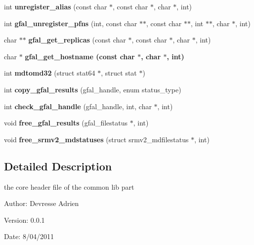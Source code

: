 \begin{CompactItemize}
\item 
int \textbf{unregister\_\-alias} (const char $\ast$, const char $\ast$, char $\ast$, int)\label{gfal__common_8h_2483d66384257fdbe3b1fd6c568709b8}

\item 
int \textbf{gfal\_\-unregister\_\-pfns} (int, const char $\ast$$\ast$, const char $\ast$$\ast$, int $\ast$$\ast$, char $\ast$, int)\label{group__internal__group_g70f889fa2436723fb7b3cff20b661f21}

\item 
char $\ast$$\ast$ \textbf{gfal\_\-get\_\-replicas} (const char $\ast$, const char $\ast$, char $\ast$, int)\label{group__internal__group_gbd0a581309f65e07a5e28d442f07b169}

\item 
char $\ast$ \bf{gfal\_\-get\_\-hostname} (const char $\ast$, char $\ast$, int)
\item 
int \textbf{mdtomd32} (struct stat64 $\ast$, struct stat $\ast$)\label{gfal__common_8h_279a394776e983460b0dc373238bbdeb}

\item 
int \textbf{copy\_\-gfal\_\-results} (gfal\_\-handle, enum status\_\-type)\label{gfal__common_8h_226eb7c7688af01a84b243e831f4af77}

\item 
int \textbf{check\_\-gfal\_\-handle} (gfal\_\-handle, int, char $\ast$, int)\label{gfal__common_8h_74b7456978e7b4059473733755d71b85}

\item 
void \textbf{free\_\-gfal\_\-results} (gfal\_\-filestatus $\ast$, int)\label{gfal__common_8h_912fe2b722650ab952e78a8c44e28660}

\item 
void \textbf{free\_\-srmv2\_\-mdstatuses} (struct srmv2\_\-mdfilestatus $\ast$, int)\label{gfal__common_8h_00141b129093611da15bab0cee7fc196}

\end{CompactItemize}


\subsection{Detailed Description}
the core header file of the common lib part 

\begin{Desc}
\item[Author:]Devresse Adrien \end{Desc}
\begin{Desc}
\item[Version:]0.0.1 \end{Desc}
\begin{Desc}
\item[Date:]8/04/2011 \end{Desc}


